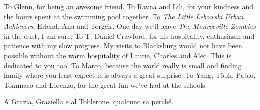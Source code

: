 To Glenn, for being an awesome friend.
To Ravna and Lili, for your kindness and the hours spent at the swimming
pool together.
To \emph{The Little Lebowski Urban Achievers}, Erlend, Ana and Torgeir.
One day we'll leave \emph{The Monroeville Zombies} in the dust, I am
sure.
To T. Daniel Crawford, for his hospitality, enthusiasm and patience with
my slow progress.
My visits to Blacksburg would not have been possible without the warm
hospitality of Laurie, Charles and Alec. This is dedicated to you too!
To Marco, because the world really is small and finding family where you
least expect it is always a great surprise.
To Yang, Töph, Pablo, Tommaso and Lorenzo, for the great fun we've had at the
schools.

\textitalian{A Grazia, Graziella e al Toblerone, qualcuno sa perché.}
